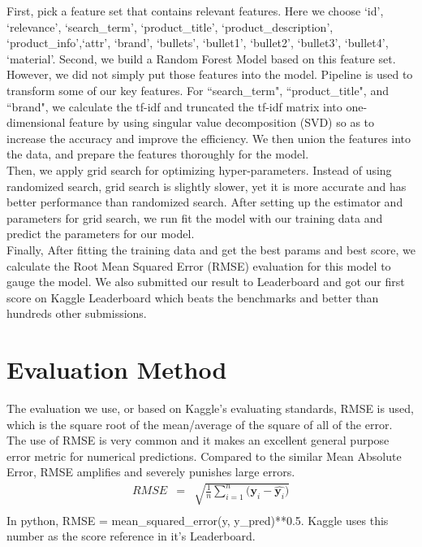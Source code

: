 \documentclass{sig-alternate-05-2015}
\begin{document}
First, pick a feature set that contains relevant features. Here we choose \lq id', \lq relevance', \lq search\_term', \lq product\_title', \lq product\_description', \lq product\_info',\lq attr', \lq brand', \lq bullets', \lq bullet1', \lq bullet2', \lq bullet3', \lq bullet4', \lq material'. Second, we build a Random Forest Model based on this feature set. However, we did not simply put those features into the model. Pipeline is used to transform some of our key features. For ``search\_term", ``product\_title", and ``brand", we calculate the tf-idf and truncated the tf-idf matrix into one-dimensional feature by using singular value decomposition (SVD) so as to increase the accuracy and improve the efficiency. We then union the features into the data, and prepare the features thoroughly for the model.\\

Then, we apply grid search for optimizing hyper-parameters. Instead of using randomized search, grid search is slightly slower, yet it is more accurate and has better performance than randomized search.\cite{grid} After setting up the estimator and parameters for grid search, we run fit the model with our training data and predict the parameters for our model.\\

Finally, After fitting the training data and get the best params and best score, we calculate the Root Mean Squared Error (RMSE) evaluation for this model to gauge the model. We also submitted our result to Leaderboard and got our first score on Kaggle Leaderboard which beats the benchmarks and better than hundreds other submissions. \\
\section{Evaluation Method}
The evaluation we use, or based on Kaggle's evaluating standards, RMSE is used, which is the square root of the mean/average of the square of all of the error. The use of RMSE is very common and it makes an excellent general purpose error metric for numerical predictions. \cite{kaggle} Compared to the similar Mean Absolute Error, RMSE amplifies and severely punishes large errors.\\
\begin{eqnarray*}
RMSE & = &\sqrt{ \frac{1}{n} \sum_{i = 1}^{n}({\mathbf{y}_i  -  \hat{\mathbf{y}_i})}} \\
\end{eqnarray*}
In python, RMSE = mean\_squared\_error(y, y\_pred)**0.5. Kaggle uses this number as the score reference in it's Leaderboard.
\end{document}
